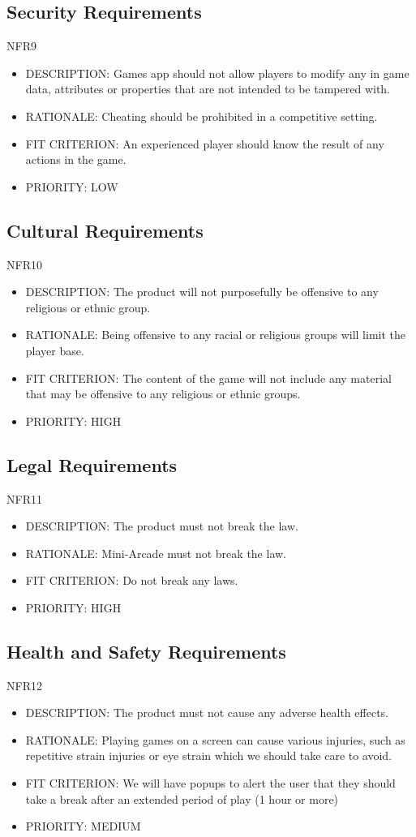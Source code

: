 \documentclass[12pt, titlepage]{article}
\begin{document}
\subsection{Security Requirements}
NFR9
\begin{itemize}
    \item DESCRIPTION: Games app should not allow players to modify any in game data, attributes or properties 
that are not intended to be tampered with.
    \item RATIONALE:  Cheating should be prohibited in a competitive setting.
    \item FIT CRITERION: An experienced player should know the result of any actions in the game.
    \item PRIORITY: LOW
\end{itemize}

\subsection{Cultural Requirements}
NFR10
\begin{itemize}
    \item DESCRIPTION: The product will not purposefully be offensive to any religious or ethnic group.
    \item RATIONALE: Being offensive to any racial or religious groups will limit the player base.
    \item FIT CRITERION: The content of the game will not include any material that may be offensive to any religious or ethnic groups.
    \item PRIORITY: HIGH
\end{itemize}
\subsection{Legal Requirements}
NFR11
\begin{itemize}
    \item DESCRIPTION: The product must not break the law.
    \item RATIONALE: Mini-Arcade must not break the law.
    \item FIT CRITERION: Do not break any laws.
    \item PRIORITY: HIGH
\end{itemize}

\subsection{Health and Safety Requirements}
NFR12
\begin{itemize}
    \item DESCRIPTION: The product must not cause any adverse health effects.
    \item RATIONALE: Playing games on a screen can cause various injuries, such as repetitive strain injuries
or eye strain which we should take care to avoid.
    \item FIT CRITERION: We will have popups to alert the user that they should take a 
break after an extended period of play (1 hour or more)
    \item PRIORITY: MEDIUM
\end{itemize}
\end{document}
